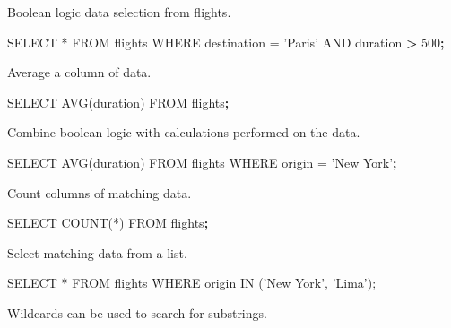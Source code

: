 \documentclass[]{book}
\newenvironment{Shaded}{\begin{snugshade}}{\end{snugshade}}
\newcommand{\KeywordTok}[1]{\textcolor[rgb]{0.13,0.29,0.53}{\textbf{#1}}}
\newcommand{\StringTok}[1]{\textcolor[rgb]{0.31,0.60,0.02}{#1}}
\newcommand{\OperatorTok}[1]{\textcolor[rgb]{0.81,0.36,0.00}{\textbf{#1}}}
\newcommand{\ExtensionTok}[1]{#1}
\newcommand{\NormalTok}[1]{#1}
\begin{document}
Boolean logic data selection from flights.

\begin{Shaded}
\begin{Highlighting}[]
\ExtensionTok{SELECT}\NormalTok{ * FROM flights WHERE destination = }\StringTok{'Paris'}\NormalTok{ AND duration }\OperatorTok{>}\NormalTok{ 500}\KeywordTok{;}
\end{Highlighting}
\end{Shaded}

Average a column of data.

\begin{Shaded}
\begin{Highlighting}[]
\ExtensionTok{SELECT}\NormalTok{ AVG(duration) }\ExtensionTok{FROM}\NormalTok{ flights}\KeywordTok{;}
\end{Highlighting}
\end{Shaded}

Combine boolean logic with calculations performed on the data.

\begin{Shaded}
\begin{Highlighting}[]
\ExtensionTok{SELECT}\NormalTok{ AVG(duration) }\ExtensionTok{FROM}\NormalTok{ flights WHERE origin = }\StringTok{'New York'}\KeywordTok{;}
\end{Highlighting}
\end{Shaded}

Count columns of matching data.

\begin{Shaded}
\begin{Highlighting}[]
\ExtensionTok{SELECT}\NormalTok{ COUNT(*) }\ExtensionTok{FROM}\NormalTok{ flights}\KeywordTok{;}
\end{Highlighting}
\end{Shaded}

Select matching data from a list.

\begin{Shaded}
\begin{Highlighting}[]
\ExtensionTok{SELECT}\NormalTok{ * FROM flights WHERE origin IN (}\StringTok{'New York'}\NormalTok{, }\StringTok{'Lima'}\NormalTok{);}
\end{Highlighting}
\end{Shaded}

Wildcards can be used to search for substrings.

\begin{Shaded}
\end{Shaded}
\end{document}
